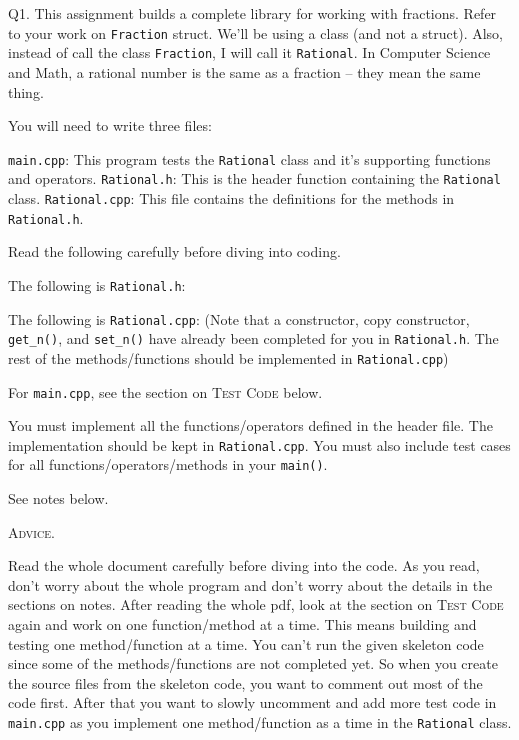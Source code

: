 Q1.
This assignment builds a complete library for working with fractions.
Refer to your work on \verb!Fraction! struct.
We'll be using a class (and not a struct).
Also, instead of call the class \verb!Fraction!, I will call it
\verb!Rational!.
In Computer Science and Math, a rational number is the same as a fraction --
they mean the same thing.

You will need to write three files:
\begin{tightlist}
  \li \verb!main.cpp!: This program tests the
  \verb!Rational! class and it's supporting functions and operators. 
  \li \verb!Rational.h!: This is the header function containing the
  \verb!Rational! class.
  \li \verb!Rational.cpp!:
  This file contains the definitions for the methods in \verb!Rational.h!.
\end{tightlist}

Read the following carefully before diving into coding.

The following is \verb!Rational.h!:
{\small
{}
}

The following is \verb!Rational.cpp!:
{\small
{}
}
(Note that a constructor, copy constructor, \verb!get_n()!, and
\verb!set_n()! have already been completed for you in \texttt{Rational.h}.
The rest of the methods/functions should be implemented in
\texttt{Rational.cpp})

For \verb!main.cpp!, see the section on \textsc{Test Code} below.

You must implement all the functions/operators defined in the header file.
The implementation should be kept in \verb!Rational.cpp!.
You must also include test cases for all functions/operators/methods in your
\verb!main()!.

See notes below.




\newpage
\textsc{Advice}. 

Read the whole document carefully before diving into the code.
As you read, don't worry about the whole program and don't worry about the
details in the sections on notes.
After reading the whole pdf, look at the section on \textsc{Test Code}
again and work on one function/method at a time.
This means building and testing one
method/function at a time.
You can't run the given skeleton code since some of the methods/functions
are not completed yet.
So when you create the source files from the skeleton code, you
want to comment out most of the code first.
After that you want to slowly
uncomment and add more test code in \verb!main.cpp! as you implement one
method/function as a time 
in the \verb!Rational!
class.

